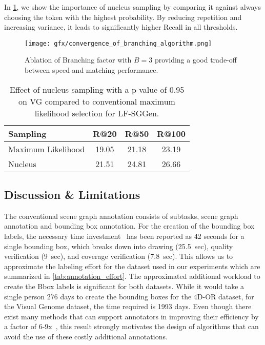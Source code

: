 \documentclass[10pt,twocolumn,letterpaper]{article}
\begin{document}
In \cref{tab:sampling_results}, we show the importance of nucleus sampling by comparing it against always choosing the token with the highest probability. By reducing repetition and increasing variance, it leads to significantly higher Recall in all thresholds.

\begin{figure}[t]
  \centering

   \texttt{[image: gfx/convergence\_of\_branching\_algorithm.png]}

   \caption{Ablation of Branching factor with $B=3$ providing a good trade-off between speed and matching performance.}
   \label{fig:convergence_20}
\end{figure}

\begin{table}
  \centering
  \begin{tabular}{l c c c}
  \toprule
Sampling & R@20 & R@50 & R@100 \\
    \midrule
    Maximum Likelihood & 19.05 & 21.18 & 23.19 \\
    Nucleus \cite{holtzman_curious_2020} & 21.51 & 24.81 & 26.66\\
    \bottomrule
  \end{tabular}
  \caption{Effect of nucleus sampling with a p-value of 0.95 on VG compared to conventional maximum likelihood selection for LF-SGGen.}
  \label{tab:sampling_results}
\end{table}


\subsection{Discussion \& Limitations}
The conventional scene graph annotation consists of subtasks, scene graph annotation and bounding box annotation. For the creation of the bounding box labels, the necessary time investment~\cite{su_crowdsourcing_2012} has been reported as 42 seconds for a single bounding box, which breaks down into drawing (25.5~sec), quality verification (9~sec), and coverage verification (7.8~sec).
This allows us to approximate the labeling effort for the dataset used in our experiments which are summarized in \cref{tab:annotation_effort}.
The approximated additional workload to create the Bbox labels is significant for both datasets. While it would take a single person 276 days to create the bounding boxes for the 4D-OR dataset, for the Visual Genome dataset, the time required is 1993 days. Even though there exist many methods that can support annotators in improving their efficiency by a factor of 6-9x~\cite{su_crowdsourcing_2012}, this result strongly motivates the design of algorithms that can avoid the use of these costly additional annotations.
\end{document}
